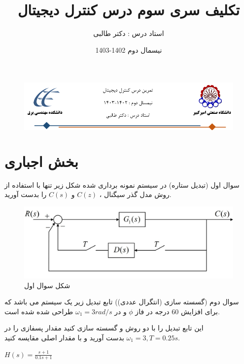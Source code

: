 \documentclass[12pt]{article}
\title{تکلیف سری سوم درس کنترل دیجیتال}
\date{نیسمال دوم 1402-1403}
\author{استاد درس : دکتر طالبی}
\begin{document}
\markboth{\theauthor}{\thetitle}



\begin{figure}[htbp]
    \centering
    \includegraphics[width=\linewidth]{Header.png}
\end{figure}


\section{بخش اجباری}

    \begin{problem}{سوال اول}
    (تبدیل ستاره) در سیستم نمونه برداری شده شکل زیر تنها با استفاده از روش مدل گذر سیگنال ، 
    $C(z)$
    و
    $C(s)$
    را بدست آورید.

    \end{problem}
    
    \begin{figure}
    	\includegraphics[width=\linewidth]{Resources/3.png}
    	\caption{شکل سوال اول}
    \end{figure}
    
    \begin{problem}{سوال دوم}
  (گسسته سازی (انتگرال عددی)) تابع تبدیل زیر یک سیستم  می باشد که برای افزایش 60 درجه در فاز 
  $\phi$
  و در
  $\omega_1 = 3 rad/s$
  طراحی شده شده است.

  این تابع تبدیل را با دو روش 
  و
  گسسته سازی کنید مقدار پسفازی را در 
  $\omega_1 = 3 , T = 0.25s$
  بدست آورید و با مقدار اصلی مقایسه کنید.
  
  \centering
 $H(s) = \frac{s + 1}{0.1s + 1}$
    \end{problem}
    
\end{document}
